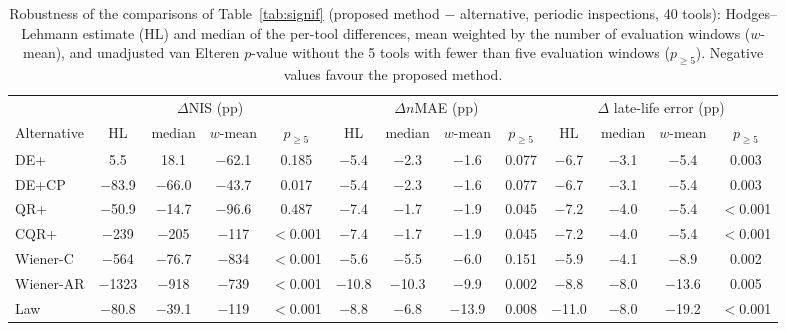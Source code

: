 \begin{table}[!htbp]
\centering
\caption{Robustness of the comparisons of Table~\ref{tab:signif} (proposed method $-$ alternative, periodic inspections, 40 tools): Hodges--Lehmann estimate (HL) and median of the per-tool differences, mean weighted by the number of evaluation windows ($w$-mean), and unadjusted van Elteren $p$-value without the 5 tools with fewer than five evaluation windows ($p_{\ge5}$). Negative values favour the proposed method.}
\label{tab:Srobust}
\scriptsize\setlength{\tabcolsep}{2.5pt}
\begin{tabular}{lcccccccccccc}
\toprule
 & \multicolumn{4}{c}{$\Delta$NIS (pp)} & \multicolumn{4}{c}{$\Delta n$MAE (pp)} & \multicolumn{4}{c}{$\Delta$ late-life error (pp)}\\
\cmidrule(lr){2-5}\cmidrule(lr){6-9}\cmidrule(lr){10-13}
Alternative & HL & median & $w$-mean & $p_{\ge5}$ & HL & median & $w$-mean & $p_{\ge5}$ & HL & median & $w$-mean & $p_{\ge5}$\\
\midrule
DE+ & 5.5 & 18.1 & $-$62.1 & 0.185 & $-$5.4 & $-$2.3 & $-$1.6 & 0.077 & $-$6.7 & $-$3.1 & $-$5.4 & 0.003\\
DE+CP & $-$83.9 & $-$66.0 & $-$43.7 & 0.017 & $-$5.4 & $-$2.3 & $-$1.6 & 0.077 & $-$6.7 & $-$3.1 & $-$5.4 & 0.003\\
QR+ & $-$50.9 & $-$14.7 & $-$96.6 & 0.487 & $-$7.4 & $-$1.7 & $-$1.9 & 0.045 & $-$7.2 & $-$4.0 & $-$5.4 & $<$0.001\\
CQR+ & $-$239 & $-$205 & $-$117 & $<$0.001 & $-$7.4 & $-$1.7 & $-$1.9 & 0.045 & $-$7.2 & $-$4.0 & $-$5.4 & $<$0.001\\
Wiener-C & $-$564 & $-$76.7 & $-$834 & $<$0.001 & $-$5.6 & $-$5.5 & $-$6.0 & 0.151 & $-$5.9 & $-$4.1 & $-$8.9 & 0.002\\
Wiener-AR & $-$1323 & $-$918 & $-$739 & $<$0.001 & $-$10.8 & $-$10.3 & $-$9.9 & 0.002 & $-$8.8 & $-$8.0 & $-$13.6 & 0.005\\
Law & $-$80.8 & $-$39.1 & $-$119 & $<$0.001 & $-$8.8 & $-$6.8 & $-$13.9 & 0.008 & $-$11.0 & $-$8.0 & $-$19.2 & $<$0.001\\
\bottomrule
\end{tabular}
\end{table}
